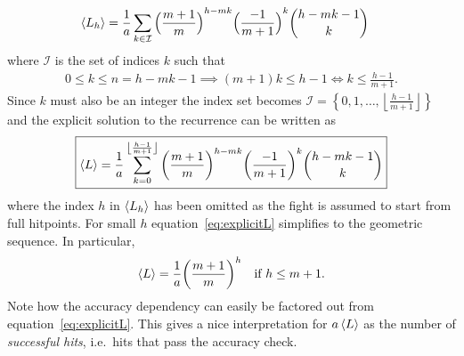 \begin{align}
    \left\langle L_h \right\rangle &= \frac{1}{a}\sum_{k \in \mathcal{I}} {\Big(\frac{m+1}{m}\Big)}^{h-mk} {\Big(\frac{-1}{m+1}\Big)}^k {h-mk-1 \choose k} \nonumber
\end{align}
where $\mathcal{I}$ is the set of indices $k$ such that
\begin{align*}
    0 \leq k \leq n = h-mk-1
    \implies (m+1)k \leq h-1
    \iff k \leq \frac{h-1}{m+1}.
\end{align*}
Since $k$ must also be an integer the index set becomes $\mathcal{I} = \left\{0,1,\ldots,\left\lfloor{\frac{h-1}{m+1}}\right\rfloor\right\}$ and the explicit solution to the recurrence can be written as
\begin{align}
	\boxed{\left\langle L \right\rangle
		= \frac{1}{a}
		\sum_{k=0}^{\left\lfloor{\frac{h-1}{m+1}}\right\rfloor} {\left(\frac{m+1}{m}\right)}^{h-mk} {\left(\frac{-1}{m+1}\right)}^k {h-mk-1 \choose k}
	}\label{eq:explicitL}
\end{align}
where the index $h$ in $\left\langle L_h \right\rangle$ has been omitted as the fight is assumed to start from full hitpoints.
For small $h$ equation~\ref{eq:explicitL} simplifies to the geometric sequence. In particular,
\begin{align}
	\left\langle L \right\rangle
		= \frac{1}{a}{\left(\frac{m+1}{m}\right)}^h \quad \mbox{if }h \leq m+1.
	\label{eq:geomL}
\end{align}
Note how the accuracy dependency can easily be factored out from equation~\ref{eq:explicitL}. This gives a nice interpretation for $a\left\langle L \right\rangle$ as the number of \emph{successful hits}, i.e.~hits that pass the accuracy check.
